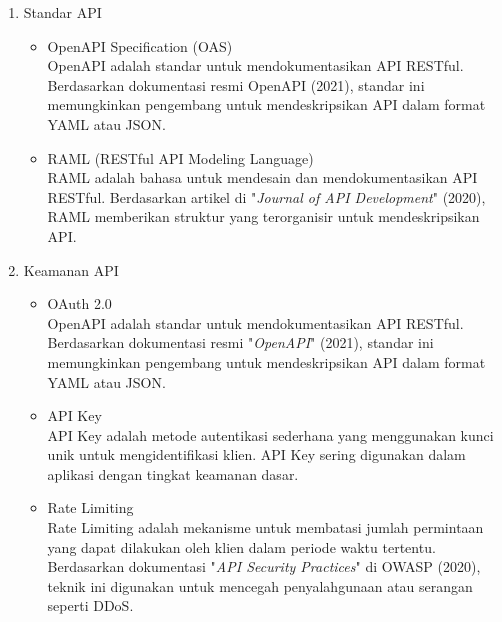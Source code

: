 \begin{enumerate}[label*=\arabic*.,ref=\arabic*]
\begin{enumerate}[label=\alph*.]
        \item Standar API
        \begin{itemize}
            \item OpenAPI Specification (OAS) \\
            OpenAPI adalah standar untuk mendokumentasikan API RESTful. Berdasarkan dokumentasi resmi OpenAPI (2021), standar ini memungkinkan pengembang untuk mendeskripsikan API dalam format YAML atau JSON.
            \item RAML (RESTful API Modeling Language) \\
            RAML adalah bahasa untuk mendesain dan mendokumentasikan API RESTful. Berdasarkan artikel di "\textit{Journal of API Development}" (2020), RAML memberikan struktur yang terorganisir untuk mendeskripsikan API.
        \end{itemize}
        
        \item Keamanan API
        \begin{itemize}
            \item OAuth 2.0 \\
            OpenAPI adalah standar untuk mendokumentasikan API RESTful. Berdasarkan dokumentasi resmi "\textit{OpenAPI}" (2021), standar ini memungkinkan pengembang untuk mendeskripsikan API dalam format YAML atau JSON.
            \item API Key \\
            API Key adalah metode autentikasi sederhana yang menggunakan kunci unik untuk mengidentifikasi klien. API Key sering digunakan dalam aplikasi dengan tingkat keamanan dasar.
            \item Rate Limiting \\
            Rate Limiting adalah mekanisme untuk membatasi jumlah permintaan yang dapat dilakukan oleh klien dalam periode waktu tertentu. Berdasarkan dokumentasi "\textit{API Security Practices}" di OWASP (2020), teknik ini digunakan untuk mencegah penyalahgunaan atau serangan seperti DDoS.
        \end{itemize}  
    \end{enumerate}
\end{enumerate}